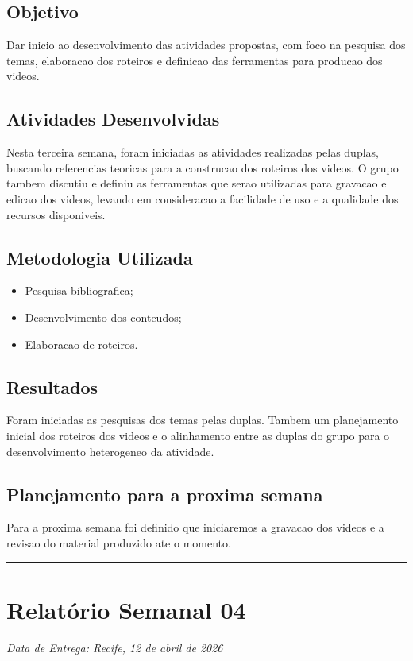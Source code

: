 \subsection{Objetivo}
Dar inicio ao desenvolvimento das atividades propostas, com foco na pesquisa dos temas, elaboracao dos roteiros e definicao das ferramentas para producao dos videos.

\subsection{Atividades Desenvolvidas}
Nesta terceira semana, foram iniciadas as atividades realizadas pelas duplas, buscando referencias teoricas para a construcao dos roteiros dos videos. O grupo tambem discutiu e definiu as ferramentas que serao utilizadas para gravacao e edicao dos videos, levando em consideracao a facilidade de uso e a qualidade dos recursos disponiveis.

\subsection{Metodologia Utilizada}
\begin{itemize}
    \item Pesquisa bibliografica;
    \item Desenvolvimento dos conteudos;
    \item Elaboracao de roteiros.
\end{itemize}

\subsection{Resultados}
Foram iniciadas as pesquisas dos temas pelas duplas. Tambem um planejamento inicial dos roteiros dos videos e o alinhamento entre as duplas do grupo para o desenvolvimento heterogeneo da atividade.

\subsection{Planejamento para a proxima semana}
Para a proxima semana foi definido que iniciaremos a gravacao dos videos e a revisao do material produzido ate o momento.

\bigskip
\hrule
\bigskip

\section{Relatório Semanal 04}
{\centering\noindent\textit{Data de Entrega: Recife, 12 de abril de 2026}\par}\bigskip

